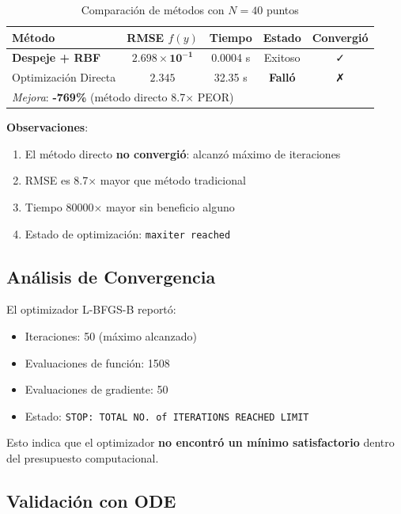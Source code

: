 \documentclass[11pt,a4paper]{article}
\begin{document}
\begin{table}[H]
\centering
\caption{Comparación de métodos con $N = 40$ puntos}
\begin{tabular}{lcccc}
\toprule
\textbf{Método} & \textbf{RMSE} $f(y)$ & \textbf{Tiempo} & \textbf{Estado} & \textbf{Convergió} \\
\midrule
\rowcolor{green!20}
\textbf{Despeje + RBF} & $\mathbf{2.698 \times 10^{-1}}$ & 0.0004 s & Exitoso & ✓ \\
\rowcolor{red!20}
Optimización Directa & $2.345$ & 32.35 s & \textbf{Falló} & ✗ \\
\midrule
\multicolumn{5}{l}{\textit{Mejora}: \textbf{-769\%} (método directo 8.7$\times$ PEOR)} \\
\bottomrule
\end{tabular}
\end{table}

\textbf{Observaciones}:
\begin{enumerate}
\item El método directo \textbf{no convergió}: alcanzó máximo de iteraciones
\item RMSE es 8.7$\times$ mayor que método tradicional
\item Tiempo 80000$\times$ mayor sin beneficio alguno
\item Estado de optimización: \texttt{maxiter reached}
\end{enumerate}

\subsection{Análisis de Convergencia}

El optimizador L-BFGS-B reportó:
\begin{itemize}
\item Iteraciones: 50 (máximo alcanzado)
\item Evaluaciones de función: 1508
\item Evaluaciones de gradiente: 50
\item Estado: \texttt{STOP: TOTAL NO. of ITERATIONS REACHED LIMIT}
\end{itemize}

Esto indica que el optimizador \textbf{no encontró un mínimo satisfactorio} dentro del presupuesto computacional.

\subsection{Validación con ODE}
\end{document}
